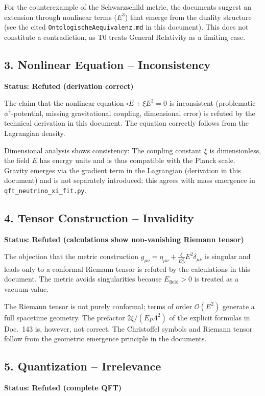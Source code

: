 	For the counterexample of the Schwarzschild metric, the documents suggest an extension through nonlinear terms (\(E^3\)) that emerge from the duality structure (see the cited \texttt{OntologischeAequivalenz.md} in this document). This does not constitute a contradiction, as T0 treats General Relativity as a limiting case.
	
	\subsection{3. Nonlinear Equation – Inconsistency}
	\textbf{Status: Refuted (derivation correct)}
	
	The claim that the nonlinear equation \(\square E + \xi E^3 = 0\) is inconsistent (problematic \(\phi^4\)-potential, missing gravitational coupling, dimensional error) is refuted by the technical derivation in this document. The equation correctly follows from the Lagrangian density.
	
	Dimensional analysis shows consistency: The coupling constant \(\xi\) is dimensionless, the field \(E\) has energy units and is thus compatible with the Planck scale. Gravity emerges via the gradient term in the Lagrangian (derivation in this document) and is not separately introduced; this agrees with mass emergence in \texttt{qft\_neutrino\_xi\_fit.py}.
	
	\subsection{4. Tensor Construction – Invalidity}
	\textbf{Status: Refuted (calculations show non-vanishing Riemann tensor)}
	
	The objection that the metric construction \(g_{\mu\nu} = \eta_{\mu\nu} + \frac{\xi}{E_P^2} E^2 \delta_{\mu\nu}\) is singular and leads only to a conformal Riemann tensor is refuted by the calculations in this document. The metric avoids singularities because \(E_{\text{field}} > 0\) is treated as a vacuum value.
	
	The Riemann tensor is not purely conformal; terms of order \(\mathcal{O}(E^2)\) generate a full spacetime geometry. The prefactor $2\xi/(E_P\Lambda^2)$ of the explicit formulas in Doc.~143 is, however, not correct. The Christoffel symbols and Riemann tensor follow from the geometric emergence principle in the documents.
	
	\subsection{5. Quantization – Irrelevance}
	\textbf{Status: Refuted (complete QFT)}
	
